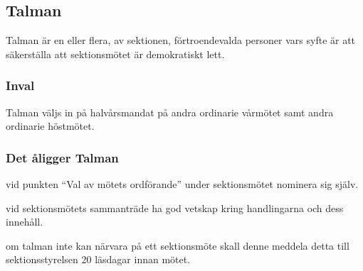 \subsection{Talman}
Talman är en eller flera, av sektionen, förtroendevalda personer vars syfte är att säkerställa att sektionsmötet är demokratiskt lett. 

\subsubsection{Inval}
Talman väljs in på halvårsmandat på andra ordinarie vårmötet samt andra ordinarie höstmötet.
\subsubsection{Det åligger Talman}
\begin{att}
  \item vid punkten ``Val av mötets ordförande'' under sektionsmötet nominera sig själv.
  \item vid sektionsmötets sammanträde ha god vetskap kring handlingarna och dess innehåll.
  \item om talman inte kan närvara på ett sektionsmöte skall denne meddela detta till sektionsstyrelsen 20 läsdagar innan mötet.
\end{att}